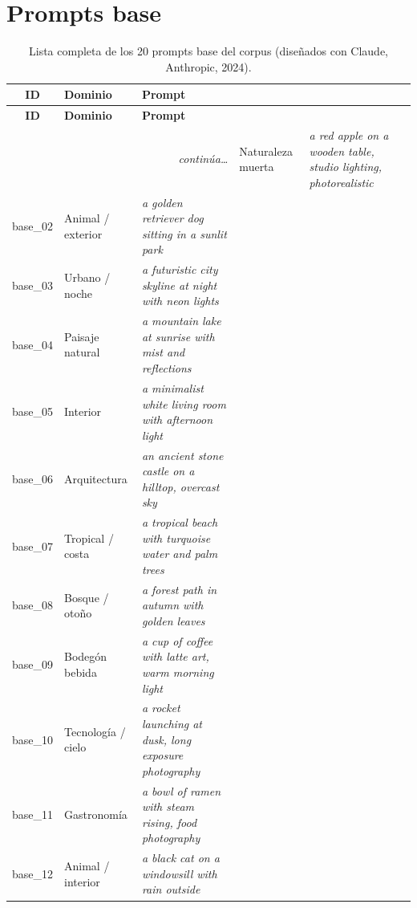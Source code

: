 \documentclass[12pt, a4paper, twoside]{book}
\begin{document}
\appendix

\label{app:prompts}

\section{Prompts base}

\begin{longtable}{clp{9.5cm}}
\caption{Lista completa de los 20 prompts base del corpus (diseñados con Claude, Anthropic, 2024).}
\label{tab:prompts_completos} \\
\toprule
\textbf{ID} & \textbf{Dominio} & \textbf{Prompt} \\
\midrule
\endfirsthead
\toprule \textbf{ID} & \textbf{Dominio} & \textbf{Prompt} \\ \midrule
\endhead
\midrule \multicolumn{3}{r}{\small\textit{continúa\ldots}} \endfoot
\bottomrule \endlastfoot
base\_01 & Naturaleza muerta & \textit{a red apple on a wooden table, studio lighting, photorealistic} \\
base\_02 & Animal / exterior & \textit{a golden retriever dog sitting in a sunlit park} \\
base\_03 & Urbano / noche & \textit{a futuristic city skyline at night with neon lights} \\
base\_04 & Paisaje natural & \textit{a mountain lake at sunrise with mist and reflections} \\
base\_05 & Interior & \textit{a minimalist white living room with afternoon light} \\
base\_06 & Arquitectura & \textit{an ancient stone castle on a hilltop, overcast sky} \\
base\_07 & Tropical / costa & \textit{a tropical beach with turquoise water and palm trees} \\
base\_08 & Bosque / otoño & \textit{a forest path in autumn with golden leaves} \\
base\_09 & Bodegón bebida & \textit{a cup of coffee with latte art, warm morning light} \\
base\_10 & Tecnología / cielo & \textit{a rocket launching at dusk, long exposure photography} \\
base\_11 & Gastronomía & \textit{a bowl of ramen with steam rising, food photography} \\
base\_12 & Animal / interior & \textit{a black cat on a windowsill with rain outside} \\

\end{longtable}
\end{document}
